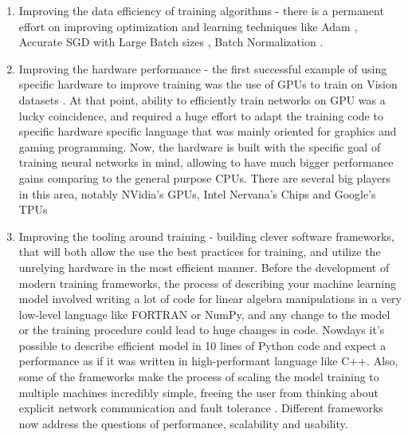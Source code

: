 \begin{enumerate}
    \item Improving the data efficiency of training algorithms - there is a permanent effort on
        improving optimization and learning techniques like Adam \cite{kingma2014adam},
        Accurate SGD with Large Batch sizes \cite{goyal2017accurate}, Batch Normalization \cite{ioffe2015batch}.

    \item Improving the hardware performance - the first successful example of using specific
        hardware to improve training was the use of GPUs to train on Vision datasets \cite{AlexNet}.
        At that point, ability to efficiently train networks on GPU was a lucky coincidence, and
        required a huge effort to adapt the training code to specific hardware specific language that
        was mainly oriented for graphics and gaming programming. Now, the hardware is built with
        the specific goal of training neural networks in mind, allowing to have much bigger performance
        gains comparing to the general purpose CPUs. There are several big players in this area,
        notably NVidia's GPUs, Intel Nervana's Chips and Google's TPUs\citep{jouppi2017datacenter}

    \item Improving the tooling around training - building clever software frameworks, that will 
        both allow the use the best practices for training, and utilize the unrelying hardware
        in the most efficient manner. Before the development of modern training frameworks, the process
        of describing your machine learning model involved writing a lot of code for linear algebra
        manipulations in a very low-level language like FORTRAN or NumPy, and any change to the model
        or the training procedure could lead to huge changes in code.
        Nowdays it's possible to describe efficient model in 10 lines of Python code and expect
        a performance as if it was written in high-performant language like C++.
        Also, some of the frameworks make the process of scaling the model training to multiple machines
        incredibly simple, freeing the user from thinking about explicit network communication and
        fault tolerance \cite{tensorflow2015-whitepaper}.
        Different frameworks now address the questions of performance, scalability and usability.
\end{enumerate}

